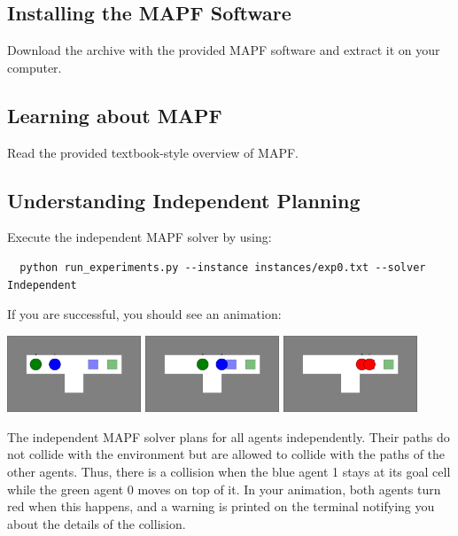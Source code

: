 \documentclass[11pt]{article}
\begin{document}
\subsection{Installing the MAPF Software}

Download the archive with the provided MAPF software and extract it on your computer.

\subsection{Learning about MAPF}

Read the provided textbook-style overview of MAPF.

\subsection{Understanding Independent Planning}

Execute the independent MAPF solver by using:

\begin{verbatim}
  python run_experiments.py --instance instances/exp0.txt --solver Independent
\end{verbatim}

If you are successful, you should see an animation:

\begin{center}
\includegraphics[width=0.3\textwidth]{images/exp1_1.png}
\hfill
\includegraphics[width=0.3\textwidth]{images/exp1_2.png}
\hfill
\includegraphics[width=0.3\textwidth]{images/exp1_3.png}
\end{center}

The independent MAPF solver plans for all agents independently. Their paths do not collide with the environment but are allowed to collide with the paths of the other agents. Thus, there is a collision when the blue agent 1 stays at its goal cell while the green agent 0 moves on top of it. In your animation, both agents turn red when this happens, and a warning is printed on the terminal notifying you about the details of the collision.
\end{document}
